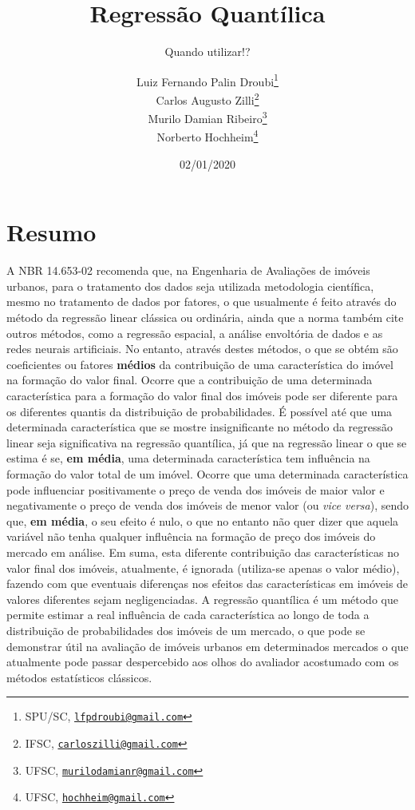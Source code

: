 \documentclass[a4paper, 12pt]{article}
\title{Regressão Quantílica}
\subtitle{Quando utilizar!?}
\author{Luiz Fernando Palin Droubi\footnote{SPU/SC,
  \href{mailto:lfpdroubi@gmail.com}{\nolinkurl{lfpdroubi@gmail.com}}} \\ Carlos Augusto Zilli\footnote{IFSC,
  \href{mailto:carloszilli@gmail.com}{\nolinkurl{carloszilli@gmail.com}}} \\ Murilo Damian Ribeiro\footnote{UFSC,
  \href{mailto:murilodamianr@gmail.com}{\nolinkurl{murilodamianr@gmail.com}}
} \\ Norberto Hochheim\footnote{UFSC,
  \href{mailto:hochheim@gmail.com}{\nolinkurl{hochheim@gmail.com}}}}
\date{02/01/2020}
\begin{document}
\maketitle

\hypertarget{resumo}{%
\section*{Resumo}\label{resumo}}

A NBR 14.653-02 \autocite{NBR1465302} recomenda que, na Engenharia de
Avaliações de imóveis urbanos, para o tratamento dos dados seja
utilizada metodologia científica, mesmo no tratamento de dados por
fatores, o que usualmente é feito através do método da regressão linear
clássica ou ordinária, ainda que a norma também cite outros métodos,
como a regressão espacial, a análise envoltória de dados e as redes
neurais artificiais. No entanto, através destes métodos, o que se obtém
são coeficientes ou fatores \textbf{médios} da contribuição de uma
característica do imóvel na formação do valor final. Ocorre que a
contribuição de uma determinada característica para a formação do valor
final dos imóveis pode ser diferente para os diferentes quantis da
distribuição de probabilidades. É possível até que uma determinada
característica que se mostre insignificante no método da regressão
linear seja significativa na regressão quantílica, já que na regressão
linear o que se estima é se, \textbf{em média}, uma determinada
característica tem influência na formação do valor total de um imóvel.
Ocorre que uma determinada característica pode influenciar positivamente
o preço de venda dos imóveis de maior valor e negativamente o preço de
venda dos imóveis de menor valor (ou \emph{vice versa}), sendo que,
\textbf{em média}, o seu efeito é nulo, o que no entanto não quer dizer
que aquela variável não tenha qualquer influência na formação de preço
dos imóveis do mercado em análise. Em suma, esta diferente contribuição
das características no valor final dos imóveis, atualmente, é ignorada
(utiliza-se apenas o valor médio), fazendo com que eventuais diferenças
nos efeitos das características em imóveis de valores diferentes sejam
negligenciadas. A regressão quantílica é um método que permite estimar a
real influência de cada característica ao longo de toda a distribuição
de probabilidades dos imóveis de um mercado, o que pode se demonstrar
útil na avaliação de imóveis urbanos em determinados mercados o que
atualmente pode passar despercebido aos olhos do avaliador acostumado
com os métodos estatísticos clássicos.
\end{document}
